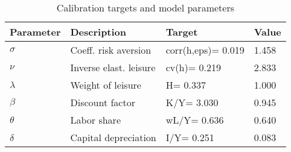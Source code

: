 \begin{table}[!htbp]
\centering
\caption{Calibration targets and model parameters}
\begin{tabular}{llll}
\toprule
Parameter & Description & Target & Value \\
\midrule
$\sigma$  & Coeff. risk aversion   & corr(h,eps)= 0.019 & 1.458 \\
$\nu$     & Inverse elast. leisure & cv(h)= 0.219       & 2.833 \\
$\lambda$ & Weight of leisure      & H= 0.337           & 1.000 \\
$\beta$   & Discount factor        & K/Y= 3.030         & 0.945 \\
$\theta$  & Labor share            & wL/Y= 0.636        & 0.640 \\
$\delta$  & Capital depreciation   & I/Y= 0.251         & 0.083 \\
\bottomrule
\end{tabular}
\end{table}
